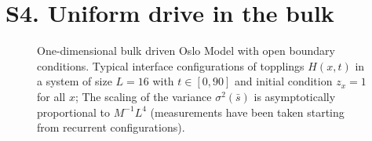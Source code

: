 \documentclass[doublecol]{epl2}
\begin{document}
 \section{S4. Uniform drive in the bulk}
 \label{sect_app_bulk}
 
 \begin{figure}
 \centering
{}
\caption{ \label{fig_oobulk} One-dimensional bulk driven Oslo Model with open boundary conditions.  Typical interface configurations of topplings $H(x,t)$ in a system of size $L=16$ with $t\in[0,90]$ and initial condition $z_x=1$ for all $x$;  The scaling of the variance $\sigma^2(\bar{s})$ is asymptotically proportional to $M^{-1}L^4$ (measurements have been taken starting from recurrent configurations).}
\end{figure}
\end{document}
